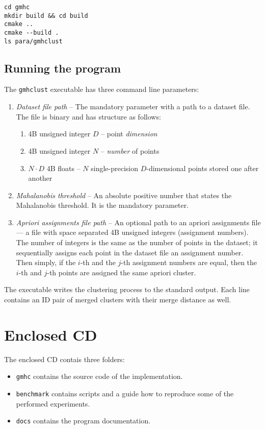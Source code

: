 \documentclass[12pt,a4paper,twoside,openright]{report}
\let\openright=\cleardoublepage
\begin{document}
\begin{lstlisting}
cd gmhc
mkdir build && cd build
cmake ..
cmake --build .
ls para/gmhclust
\end{lstlisting}

\section{Running the program}

The \texttt{gmhclust} executable has three command line parameters:
\begin{enumerate}
	\item \emph{Dataset file path} -- The mandatory parameter with a path to a dataset file. The file is binary and has structure as follows:
	\begin{enumerate}
		\item 4B unsigned integer $D$ -- point \emph{dimension}
		\item 4B unsigned integer $N$ -- \emph{number} of points
		\item $N\cdot D$ 4B floats -- $N$ single-precision $D$-dimensional points stored one after another
	\end{enumerate}
	\item \emph{Mahalanobis threshold} -- An absolute positive number that states the Mahalanobis threshold. It is the mandatory parameter.
	\item \emph{Apriori assignments file path} -- An optional path to an apriori assignments file --- a file with space separated 4B unsigned integers (assignment numbers). The number of integers is the same as the number of points in the dataset; it sequentially assigns each point in the dataset file an assignment number. Then simply, if the $i$-th and the $j$-th assignment numbers are equal, then the $i$-th and $j$-th points are assigned the same apriori cluster. 
\end{enumerate}

The executable writes the clustering process to the standard output. Each line contains an ID pair of merged clusters with their merge distance as well.


\chapter{Enclosed CD}

The enclosed CD contais three folders:

\begin{itemize}
	\item \texttt{gmhc} contains the source code of the implementation.
	\item \texttt{benchmark} contains scripts and a guide how to reproduce some of the performed experiments.
	\item \texttt{docs} contains the program documentation.
\end{itemize} 


\openright
\end{document}
